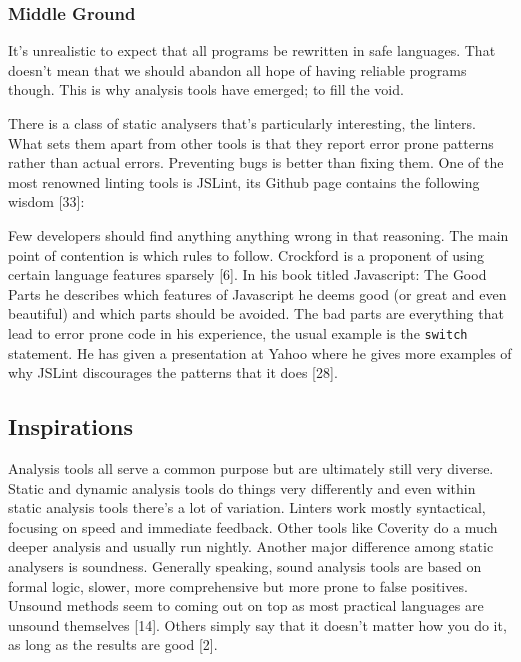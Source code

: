 \documentclass[]{article}
\begin{document}
\subsubsection{Middle Ground}\label{middle-ground}

It's unrealistic to expect that all programs be rewritten in safe
languages. That doesn't mean that we should abandon all hope of having
reliable programs though. This is why analysis tools have emerged; to
fill the void.

There is a class of static analysers that's particularly interesting,
the linters. What sets them apart from other tools is that they report
error prone patterns rather than actual errors. Preventing bugs is
better than fixing them. One of the most renowned linting tools is
JSLint, its Github page contains the following wisdom {[}33{]}:


Few developers should find anything anything wrong in that reasoning.
The main point of contention is which rules to follow. Crockford is a
proponent of using certain language features sparsely {[}6{]}. In his
book titled Javascript: The Good Parts he describes which features of
Javascript he deems good (or great and even beautiful) and which parts
should be avoided. The bad parts are everything that lead to error prone
code in his experience, the usual example is the \texttt{switch}
statement. He has given a presentation at Yahoo where he gives more
examples of why JSLint discourages the patterns that it does {[}28{]}.

\subsection{Inspirations}\label{inspirations}

Analysis tools all serve a common purpose but are ultimately still very
diverse. Static and dynamic analysis tools do things very differently
and even within static analysis tools there's a lot of variation.
Linters work mostly syntactical, focusing on speed and immediate
feedback. Other tools like Coverity do a much deeper analysis and
usually run nightly. Another major difference among static analysers is
soundness. Generally speaking, sound analysis tools are based on formal
logic, slower, more comprehensive but more prone to false positives.
Unsound methods seem to coming out on top as most practical languages
are unsound themselves {[}14{]}. Others simply say that it doesn't
matter how you do it, as long as the results are good {[}2{]}.
\end{document}
